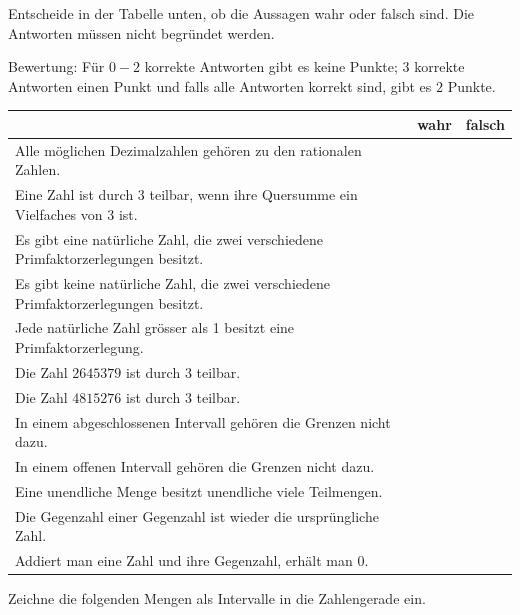 \documentclass[11pt]{exam}
\begin{document}
\begin{questions}
\question[2]
Entscheide in der Tabelle unten, ob die Aussagen wahr oder falsch sind. Die Antworten müssen nicht begründet werden.\newline
\begin{small}
    Bewertung: Für $0-2$ korrekte Antworten gibt es keine Punkte; $3$ korrekte Antworten einen Punkt und falls alle Antworten korrekt sind, gibt es $2$ Punkte.
\end{small}
\begingroup
\renewcommand{\arraystretch}{1.5}
\begin{table}[h]
    \centering
    \begin{tabular}{|p{12cm}|c|c|}\hline
         & wahr & falsch \\\hline
        Alle möglichen Dezimalzahlen gehören zu den rationalen Zahlen. & & \\\hline
        Eine Zahl ist durch $3$ teilbar, wenn ihre Quersumme ein Vielfaches von $3$ ist. & & \\\hline
        Es gibt eine natürliche Zahl, die zwei verschiedene Primfaktorzerlegungen besitzt.  & & \\\hline
        Es gibt keine natürliche Zahl, die zwei verschiedene Primfaktorzerlegungen besitzt.  & & \\\hline
        Jede natürliche Zahl grösser als 1 besitzt eine Primfaktorzerlegung. & & \\\hline
        Die Zahl $2645379$ ist durch $3$ teilbar. & & \\\hline
        Die Zahl $4815276$ ist durch $3$ teilbar. & & \\\hline
        In einem abgeschlossenen Intervall gehören die Grenzen nicht dazu. & & \\\hline
        In einem offenen Intervall gehören die Grenzen nicht dazu. & & \\\hline
        Eine unendliche Menge besitzt unendliche viele Teilmengen. & & \\\hline
        Die Gegenzahl einer Gegenzahl ist wieder die ursprüngliche Zahl. & & \\\hline
        Addiert man eine Zahl und ihre Gegenzahl, erhält man $0$. & & \\\hline
    \end{tabular}
\end{table}
\endgroup


\noaddpoints
\question[\totalpoints]
\addpoints
Zeichne die folgenden Mengen als Intervalle in die Zahlengerade ein.
\begin{parts}

\end{parts}
\end{questions}
\end{document}
